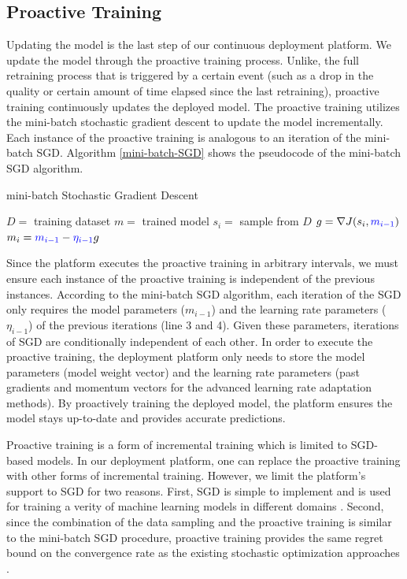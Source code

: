 \subsection{Proactive Training}\label{proactive-training}
Updating the model is the last step of our continuous deployment platform.
We update the model through the proactive training process.
Unlike, the full retraining process that is triggered by a certain event (such as a drop in the quality or certain amount of time elapsed since the last retraining), proactive training continuously updates the deployed model.
The proactive training utilizes the mini-batch stochastic gradient descent to update the model incrementally.
Each instance of the proactive training is analogous to an iteration of the mini-batch SGD.
Algorithm \ref{mini-batch-SGD} shows the pseudocode of the mini-batch SGD algorithm.
\begin{algorithm}
\caption{mini-batch Stochastic Gradient Descent}\label{mini-batch-SGD}
\begin{algorithmic}[1]
\Require  $D=$ training dataset
\Ensure $m=$ trained model
	\State $s_i =$ sample from $D$
	\State $g = \nabla J(s_i, \textcolor{blue}{m_{i-1}})$
	\State $m_i = \textcolor{blue}{m_{i-1}} - \textcolor{blue}{\eta_{i-1}}g$
\EndFor
\end{algorithmic}
\end{algorithm}

Since the platform executes the proactive training in arbitrary intervals, we must ensure each instance of the proactive training is independent of the previous instances.
According to the mini-batch SGD algorithm, each iteration of the SGD only requires the model parameters ($m_{i-1}$) and the learning rate parameters ($\eta_{i-1}$) of the previous iterations (line 3 and 4).
Given these parameters, iterations of SGD are conditionally independent of each other.
In order to execute the proactive training, the deployment platform only needs to store the model parameters (model weight vector) and the learning rate parameters (past gradients and momentum vectors for the advanced learning rate adaptation methods).
By proactively training the deployed model, the platform ensures the model stays up-to-date and provides accurate predictions.

Proactive training is a form of incremental training \cite{gepperth2016incremental} which is limited to SGD-based models.
In our deployment platform, one can replace the proactive training with other forms of incremental training.
However, we limit the platform's support to SGD for two reasons.
First, SGD is simple to implement and is used for training a verity of machine learning models in different domains \cite{ macmahan2013, bottou1995convergence, koren2009matrix,  funk2006netflix}. 
Second, since the combination of the data sampling and the proactive training is similar to the mini-batch SGD procedure, proactive training provides the same regret bound on the convergence rate as the existing stochastic optimization approaches \cite{zhang2004solving, kingma2014adam}.

